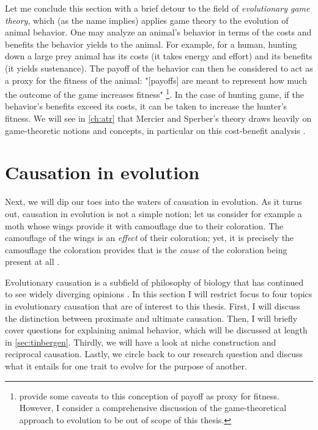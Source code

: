 Let me conclude this section with a brief detour to the field of \emph{evolutionary game theory}, which (as the name implies) applies game theory to the evolution of animal behavior. One may analyze an animal's behavior in terms of the costs and benefits the behavior yields to the animal. For example, for a human, hunting down a large prey animal has its costs (it takes energy and effort) and its benefits (it yields sustenance).
The payoff of the behavior can then be considered to act as a proxy for the fitness of the animal: "[payoffs] are meant to represent how much the outcome of the game increases fitness" \citep[p.~118]{McNamara10}\footnote{\citet[\S 4.4]{McNamara10} provide some caveats to this conception of payoff as proxy for fitness. However, I consider a comprehensive discussion of the game-theoretical approach to evolution to be out of scope of this thesis.}. In the case of hunting game, if the behavior's benefits exceed its costs, it can be taken to increase the hunter's fitness.
We will see in \cref{ch:atr} that Mercier and Sperber's theory draws heavily on game-theoretic notions and concepts, in particular on this cost-benefit analysis \citep[see][]{Sperber01, Sperber10}.

\section{Causation in evolution}
\label{sec:causation-evolution}

Next, we will dip our toes into the waters of causation in evolution. As it turns out, causation in evolution is not a simple notion; let us consider for example a moth whose wings provide it with camouflage due to their coloration. The camouflage of the wings is an \emph{effect} of their coloration; yet, it is precisely the camouflage the coloration provides that is the \emph{cause} of the coloration being present at all \citep{Lipton09}.

Evolutionary causation is a subfield of philosophy of biology that has continued to see widely diverging opinions \citep{Baedke2021, S-P13}. In this section I will restrict focus to four topics in evolutionary causation that are of interest to this thesis. First, I will discuss the distinction between proximate and ultimate causation. Then, I will briefly cover  questions for explaining animal behavior, which will be discussed at length in \cref{sec:tinbergen}. Thirdly, we will have a look at niche construction and reciprocal causation. Lastly, we circle back to our research question and discuss what it entails for one trait to evolve for the purpose of another.

